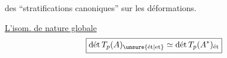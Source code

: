 
 des ``stratifications canoniques'' sur les déformations.

\uline{L'isom. de nature globale}
\[
\boxed{\operatorname{\text{dét}} T_p(A)_{\text{\unsure{ét|et}}}\simeq\operatorname{\text{dét}} T_p(A^{*})_{\text{ét}}}
\]

